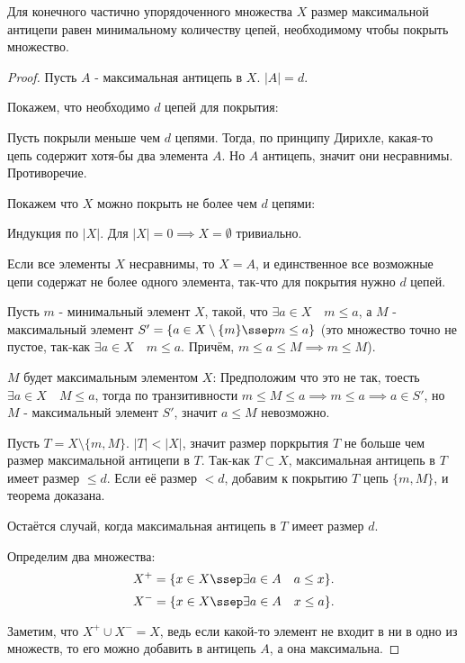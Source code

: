 \begin{theorem} \thmslashn

   Для конечного частично упорядоченного множества $X$ размер максимальной антицепи равен минимальному количеству цепей, необходимому чтобы покрыть множество.

    \begin{proof} \thmslashn
    
        Пусть $A$ - максимальная антицепь в $X$. $|A| = d$.

        Покажем, что необходимо $d$ цепей для покрытия:

        Пусть покрыли меньше чем $d$ цепями. Тогда, по принципу Дирихле, какая-то цепь содержит хотя-бы два элемента $A$. Но $A$ антицепь, значит они несравнимы. Противоречие.

        Покажем что $X$ можно покрыть не более чем $d$ цепями:
        
        Индукция по $|X|$. Для $|X| = 0 \implies X=\emptyset$ тривиально.

        Если все элементы $X$ несравнимы, то $X = A$, и единственное все возможные цепи содержат не более одного элемента, так-что для покрытия нужно $d$ цепей.

        Пусть $m$ - минимальный элемент $X$, такой, что $\exists{a\in X}\quad m \le a$, а $M$ - максимальный элемент  $S' = \{a\in X \setminus \{m\} \ssep m \le a \} $ (это множество точно не пустое, так-как $\exists{a\in X}\quad m \le  a$. Причём, $m \le a \le M \implies m \le M$). 

        $M$ будет максимальным элементом $X$: Предположим что это не так, тоесть $\exists{a\in X}\quad M \le a$, тогда по транзитивности $m \le M \le a \implies m \le a \implies a\in S'$, но $M$ - максимальный элемент  $S'$, значит  $a \le M$ невозможно.

        Пусть $T = X \setminus \{m, M\} $. $|T| < |X|$, значит размер поркрытия $T$ не больше чем размер максимальной антицепи в $T$. Так-как $T \subset X$, максимальная антицепь в $T$ имеет размер $\le d$. Если её размер $< d$, добавим к покрытию $T$ цепь $\{m, M\} $, и теорема доказана.

        Остаётся случай, когда максимальная антицепь в $T$ имеет размер $d$.

        Определим два множества:
        \[ X^{+} = \{x\in X \ssep \exists{a\in A}\quad a \le x\} .\]
        \[ X^{-} = \{x\in X \ssep \exists{a\in A}\quad x \le a\}  .\]

        Заметим, что $X^{+} \cup X^{-} = X$, ведь если какой-то элемент не входит в ни в одно из множеств, то его можно добавить в антицепь $A$, а она максимальна.


\end{proof}
\end{theorem}
